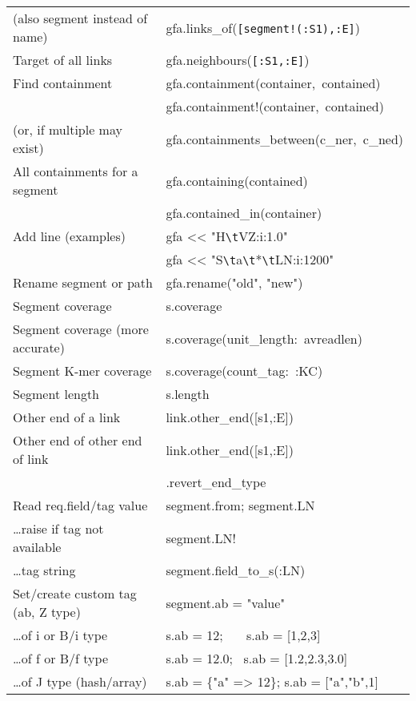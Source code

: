 \documentclass[12pt]{scrartcl}
\begin{document}
\begin{tabular}{|l|>{\ttfamily}l|}
  (also segment instead of name) &
  gfa.links\_of(\verb/[segment!(:S1),:E]/) \\
  Target of all links & gfa.neighbours(\verb/[:S1,:E]/) \\
  \hline
  Find containment  & gfa.containment(container,~contained)\\
                    & gfa.containment!(container,~contained)\\
  (or, if multiple may exist)  & gfa.containments\_between(c\_ner,~c\_ned)\\
  All containments for a segment & gfa.containing(contained)\\
                                 & gfa.contained\_in(container)\\
  \hline
  Add line (examples)        & gfa << "H\verb/\t/VZ:i:1.0" \\
                             & gfa << "S\verb/\t/a\verb/\t/*\verb/\t/LN:i:1200" \\
  Rename segment or path & gfa.rename("old", "new") \\
  \hline
  Segment coverage & s.coverage\\
  Segment coverage (more accurate) & s.coverage(unit\_length:~avreadlen)\\
  Segment K-mer coverage & s.coverage(count\_tag:~:KC)\\
  Segment length & s.length\\
  Other end of a link & link.other\_end([s1,:E])\\
  Other end of other end of link &
  link.other\_end([s1,:E])\\
  & \hspace{2.8cm}.revert\_end\_type\\
  \hline
  Read req.field/tag value & segment.from; segment.LN \\
  \ldots raise if tag not available & segment.LN! \\
  \ldots tag string & segment.field\_to\_s(:LN) \\
  \hline
  Set/create custom tag (ab, Z type) & segment.ab = "value" \\
  \ldots of i or B/i type & s.ab = 12; \ \ \ s.ab = [1,2,3]\\
  \ldots of f or B/f type & s.ab = 12.0; \ s.ab = [1.2,2.3,3.0] \\
  \ldots of J type (hash/array) & s.ab = \{"a" => 12\}; s.ab = ["a","b",1] \\
  \hline

\end{tabular}
\end{document}
